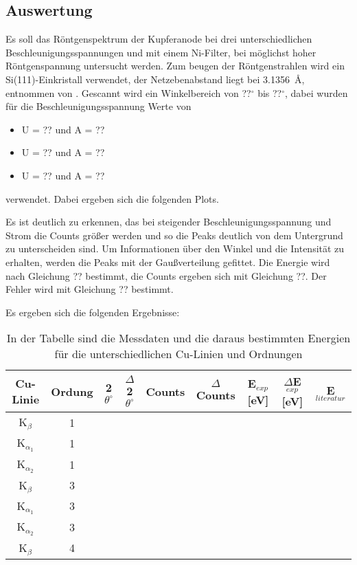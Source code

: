 \subsection{Auswertung}
Es soll das R\"ontgenspektrum der Kupferanode bei drei unterschiedlichen Beschleunigungsspannungen und mit einem Ni-Filter, bei m\"oglichst hoher R\"ontgenspannung untersucht werden.
Zum beugen der R\"ontgenstrahlen wird ein Si(111)-Einkristall verwendet, der Netzebenabstand liegt bei \SI{3,1356}{\angstrom}, entnommen von \cite{si_a}.
Gescannt wird ein Winkelbereich von ??$^\circ$ bis ??$^\circ$, dabei wurden f\"ur die Beschleunigungsspannung Werte von
\begin{itemize}
\item U = ?? und A = ??
\item U = ?? und A = ??
\item U = ?? und A = ??
\end{itemize}
 verwendet. Dabei ergeben sich die folgenden Plots.
 
 
 
Es ist deutlich zu erkennen, das bei steigender Beschleunigungsspannung und Strom die Counts gr\"o\ss er werden und so die Peaks deutlich von dem Untergrund zu unterscheiden sind.
Um Informationen \"uber den Winkel und die Intensit\"at zu erhalten, werden die Peaks mit der Gau\ss verteilung gefittet.
Die Energie wird nach Gleichung ?? bestimmt, die Counts ergeben sich mit Gleichung ??. Der Fehler wird mit Gleichung ?? bestimmt.

Es ergeben sich die folgenden Ergebnisse:

\begin{table}[H]
\caption{In der Tabelle sind die Messdaten und die daraus bestimmten Energien f\"ur die unterschiedlichen Cu-Linien und Ordnungen}
\label{tab:ergebnisse_1}
\centering
\begin{tabular}{|c|c|c|c|c|c|c|c|c|}
\hline Cu-Linie & Ordung & 2$\theta^\circ$ & $\Delta$2$\theta^\circ$ & Counts & $\Delta$Counts & E$_{exp}$[eV] & $\Delta$E$_{exp}$[eV] & E$_{literatur}$ \\ 
\hline K$_\beta$ & 1 &  &  &  &  &  &  &  \\ 
\hline K$_{\alpha_1}$ & 1 &  &  &  &  &  &  &  \\ 
\hline K$_{\alpha_2}$ & 1 &  &  &  &  &  &  &  \\ 
\hline K$_\beta$ & 3 &  &  &  &  &  &  &  \\ 
\hline K$_{\alpha_1}$ & 3 &  &  &  &  &  &  &  \\ 
\hline K$_{\alpha_2}$ & 3 &  &  &  &  &  &  &  \\ 
\hline K$_\beta$ & 4 &  &  &  &  &  &  &  \\ 
\hline 
\end{tabular}
\end{table}

